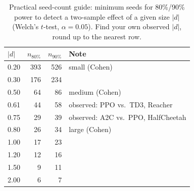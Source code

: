 \begin{table}[t]
\centering
\caption{Practical seed-count guide: minimum seeds for 80\%/90\% power to detect a two-sample effect of a given size $|d|$ (Welch's $t$-test, $\alpha{=}0.05$). Find your own observed $|d|$, round up to the nearest row.}
\label{tab:seed_guide}
\begin{tabular}{lrrl}
\toprule
$|d|$ & $n_{80\%}$ & $n_{90\%}$ & Note \\
\midrule
0.20 & 393 & 526 & small (Cohen) \\
0.30 & 176 & 234 &  \\
0.50 & 64 & 86 & medium (Cohen) \\
0.61 & 44 & 58 & observed: PPO vs.\ TD3, Reacher \\
0.75 & 29 & 39 & observed: A2C vs.\ PPO, HalfCheetah \\
0.80 & 26 & 34 & large (Cohen) \\
1.00 & 17 & 23 &  \\
1.20 & 12 & 16 &  \\
1.50 & 9 & 11 &  \\
2.00 & 6 & 7 &  \\
\bottomrule
\end{tabular}
\end{table}